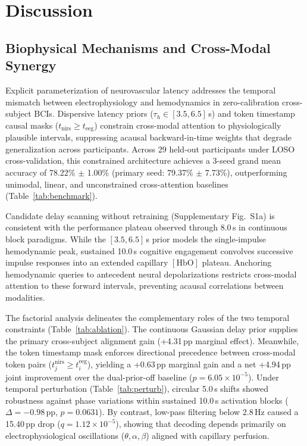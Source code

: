 \documentclass[journal]{IEEEtran}
\begin{document}
\section{Discussion}
\label{sec:discussion}
\subsection{Biophysical Mechanisms and Cross-Modal Synergy}
Explicit parameterization of neurovascular latency addresses the temporal mismatch between electrophysiology and hemodynamics in zero-calibration cross-subject BCIs. Dispersive latency priors ($\tau_h \in [3.5, 6.5]$\,s) and token timestamp causal masks ($t_{\mathrm{nirs}} \ge t_{\mathrm{eeg}}$) constrain cross-modal attention to physiologically plausible intervals, suppressing acausal backward-in-time weights that degrade generalization across participants. Across 29 held-out participants under LOSO cross-validation, this constrained architecture achieves a 3-seed grand mean accuracy of 78.22\% $\pm$ 1.00\% (primary seed: 79.37\% $\pm$ 7.73\%), outperforming unimodal, linear, and unconstrained cross-attention baselines (Table~\ref{tab:benchmark}).

Candidate delay scanning without retraining (Supplementary Fig.~S1a) is consistent with the performance plateau observed through 8.0\,s in continuous block paradigms. While the $[3.5, 6.5]$\,s prior models the single-impulse hemodynamic peak, sustained 10.0\,s cognitive engagement convolves successive impulse responses into an extended capillary $[\mathrm{HbO}]$ plateau. Anchoring hemodynamic queries to antecedent neural depolarizations restricts cross-modal attention to these forward intervals, preventing acausal correlations between modalities.

The factorial analysis delineates the complementary roles of the two temporal constraints (Table~\ref{tab:ablation}). The continuous Gaussian delay prior supplies the primary cross-subject alignment gain (+4.31\,pp marginal effect). Meanwhile, the token timestamp mask enforces directional precedence between cross-modal token pairs ($t_j^{\mathrm{nirs}} \ge t_i^{\mathrm{eeg}}$), yielding a +0.63\,pp marginal gain and a net +4.94\,pp joint improvement over the dual-prior-off baseline ($p = 6.05\times 10^{-5}$). Under temporal perturbation (Table~\ref{tab:perturb}), circular 5.0\,s shifts showed robustness against phase variations within sustained 10.0\,s activation blocks ($\Delta = -0.98$\,pp, $p = 0.0631$). By contrast, low-pass filtering below 2.8\,Hz caused a 15.40\,pp drop ($q = 1.12 \times 10^{-5}$), showing that decoding depends primarily on electrophysiological oscillations ($\theta, \alpha, \beta$) aligned with capillary perfusion.
\end{document}
